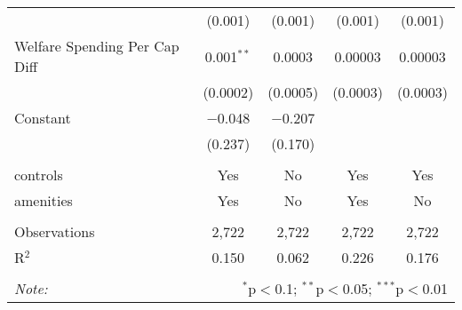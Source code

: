 \begin{table}[!htbp]
\begin{tabular}{@{\extracolsep{5pt}}lcccc}
  & (0.001) & (0.001) & (0.001) & (0.001) \\ 
  Welfare Spending Per Cap Diff & 0.001$^{**}$ & 0.0003 & 0.00003 & 0.00003 \\ 
  & (0.0002) & (0.0005) & (0.0003) & (0.0003) \\ 
  Constant & $-$0.048 & $-$0.207 &  &  \\ 
  & (0.237) & (0.170) &  &  \\ 
 \hline \\[-1.8ex] 
controls & Yes & No & Yes & Yes \\ 
amenities & Yes & No & Yes & No \\ 
\hline \\[-1.8ex] 
Observations & 2,722 & 2,722 & 2,722 & 2,722 \\ 
R$^{2}$ & 0.150 & 0.062 & 0.226 & 0.176 \\ 
\hline 
\hline \\[-1.8ex] 
\textit{Note:}  & \multicolumn{4}{r}{$^{*}$p$<$0.1; $^{**}$p$<$0.05; $^{***}$p$<$0.01} \\ 
\end{tabular} 
\end{table} 
